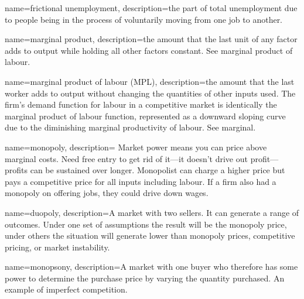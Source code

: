 {
name=frictional unemployment,
description={the part of total unemployment  due to people being in the process of voluntarily moving from one job to another.}
}

{
name=marginal product,
description={the amount that the last unit of any factor  adds to output while holding all other factors constant. See \gls{marginal product of labour}.}
}


{
name=marginal product of labour (MPL),
description={the amount that the last worker  adds to output without changing the quantities of other inputs used. The firm's \gls{demand function} for labour in a competitive market is identically  the \gls{marginal product} of labour function, represented as a downward sloping curve due to the diminishing marginal productivity of labour. See \gls{marginal}.}
}

{
name=monopoly,
description={ Market power means you can price above marginal costs. Need free entry to get rid of it---it doesn't drive out profit---profits can be sustained over longer. Monopolist can charge a higher price but pays a competitive price for all \glspl{input} including labour. If a firm also had a monopoly on offering jobs, they could drive down wages.}
}

{
name=duopoly,
description={A market with two sellers. It can generate a range of outcomes. Under one set of assumptions the result will be the monopoly price, under others the situation will generate lower than monopoly prices, competitive pricing, or market instability.}
}

{
name=monopsony,
description={A market with one buyer who therefore has some power to determine the purchase price by varying the quantity purchased. An example of \gls{imperfect competition}.}
}

